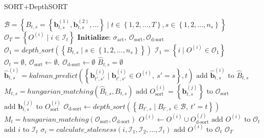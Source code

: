         \begin{algorithm}[t]
            \caption{SORT+DepthSORT}
            \label{alg:sort_depthsort}
            \small
            \begin{algorithmic}[1]
                \Require $\mathcal{B} = \left\{B_{t,s} = \left\{\bm{b}_{t,s}^{(1)}, \bm{b}_{t,s}^{(2)}, \dots\right\} \mid t \in \left\{1, 2, \dots, T\right\}, s \in \left\{1, 2, \dots, n_s\right\}\right\}$
                \Ensure $\mathcal{O}_T = \left\{O^{(i)} \mid i \in \mathcal{I}_t\right\}$
                \State $\textbf{Initialize: } \sigma_{\text{act}},\ \mathcal{O}_{\text{sort}}, \mathcal{O}_{\text{d-sort}}$
                \State $\mathcal{O}_1 = depth\_sort(\left\{B_{t, s} \mid s \in \left\{1, 2, \dots, n_s\right\}\right\})$
                \State $\mathcal{I}_1 = \left\{i \mid O^{(i)} \in \mathcal{O}_1\right\}$
                    \State $\mathcal{O}_t = \emptyset,\ \mathcal{O}_{\text{sort}} \gets \emptyset,\ \mathcal{O}_{\text{d-sort}} \gets \emptyset$
                        \State $\hat{B}_{t,s} = \emptyset$
                            \State $\hat{\bm{b}}_{t,s}^{(i)} = kalman\_predict\left(\left\{\bm{b}_{t',s'}^{(i)} \mid \bm{b}_{t',s'}^{(i)} \in O^{(i)} , ~ s' = s\right\}, t\right)$
                            \State $\text{add } \hat{\bm{b}}_{t,s}^{(i)} \text{ to }\hat{B}_{t,s}$
                        \EndFor
                        \State $M_{t,s} = hungarian\_matching(\hat{B}_{t,s}, B_{t,s})$
                                \State $\text{add } O_{\text{sort}}^{(i)} = \left\{\bm{b}_{t,s}^{(j)}\right\} \text{ to } \mathcal{O}_{\text{sort}}$
                            \Else
                                \State $\text{add } \bm{b}_{t,s}^{(j)} \text{ to } O_{\text{sort}}^{(i)}$
                            \EndIf
                        \EndFor
                    \EndFor 
                    \State $\mathcal{O}_{\text{d-sort}} \gets depth\_sort\left(\left\{B_{t',s} \mid B_{t',s} \in \mathcal{B} , ~ t' = t\right\}\right)$
                    \State $M_t = hungarian\_matching(\mathcal{O}_{\text{sort}}, \mathcal{O}_{\text{d-sort}})$
                        \State $O^{(i)} \gets O^{(i)} \cup O_{\text{d-sort}}^{(j)}$
                        \State $\text{add } O^{(i)} \text{ to } \mathcal{O}_t $
                        \State $\text{add } i \text{ to } \mathcal{I}_t$
                    \EndFor
                        \State $\sigma_i = calculate\_staleness(i, \mathcal{I}_1, \mathcal{I}_2, \dots, \mathcal{I}_t)$
                            \State $\text{add } O^{(i)} \text{ to } \mathcal{O}_t$
                        \EndIf
                    \EndFor
                \EndFor
                \State \Return $\mathcal{O}_T$
            \end{algorithmic}
        \end{algorithm}

